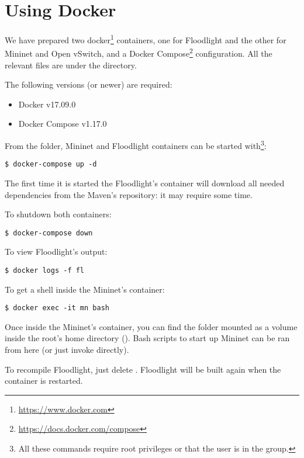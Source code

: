 \section{Using Docker}

We have prepared two docker\footnote{\url{https://www.docker.com}} containers,
one for Floodlight and the other for Mininet and Open vSwitch, and a Docker
Compose\footnote{\url{https://docs.docker.com/compose}} configuration. All the
relevant files are under the  directory.

The following versions (or newer) are required:
\begin{itemize}
	\item Docker v17.09.0
	\item Docker Compose v1.17.0
\end{itemize}

From the  folder, Mininet and Floodlight containers can be started
with\footnote{All these commands require root privileges or that the user is in
the  group.}:
\begin{verbatim}
$ docker-compose up -d
\end{verbatim}

The first time it is started the Floodlight's container will download all needed
dependencies from the Maven's repository: it may require some time.

To shutdown both containers:
\begin{verbatim}
$ docker-compose down
\end{verbatim}

To view Floodlight's output:
\begin{verbatim}
$ docker logs -f fl
\end{verbatim}

To get a shell inside the Mininet's container:
\begin{verbatim}
$ docker exec -it mn bash
\end{verbatim}
Once inside the Mininet's container, you can find the  folder
mounted as a volume inside the root's home directory ().
Bash scripts to start up Mininet can be ran from here (or just invoke 
directly).

To recompile Floodlight, just delete . Floodlight
will be built again when the container is restarted.
